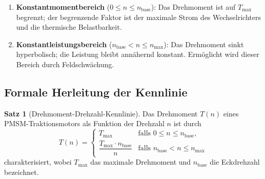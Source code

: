 ﻿\documentclass[a4paper,12pt]{article}
\theoremstyle{definition}
\newtheorem{satz}{Satz}
\begin{document}
\begin{enumerate}
    \item \textbf{Konstantmomentbereich} ($0 \leq n \leq n_{\mathrm{base}}$):
          Das Drehmoment ist auf $T_{\max}$ begrenzt; der begrenzende Faktor ist
          der maximale Strom des Wechselrichters und die thermische Belastbarkeit.
    \item \textbf{Konstantleistungsbereich} ($n_{\mathrm{base}} < n \leq n_{\max}$):
          Das Drehmoment sinkt hyperbolisch; die Leistung bleibt annähernd konstant.
          Ermöglicht wird dieser Bereich durch Feldschwächung.
\end{enumerate}

\subsection{Formale Herleitung der Kennlinie}

\begin{satz}[Drehmoment-Drehzahl-Kennlinie]
\label{satz:kennlinie}
    Das Drehmoment $T(n)$ eines PMSM-Traktionsmotors als Funktion der Drehzahl $n$
    ist durch
    \[
        T(n) =
        \begin{cases}
            T_{\max}                            & \text{falls } 0 \leq n \leq n_{\mathrm{base}}, \\[4pt]
            \dfrac{T_{\max} \cdot n_{\mathrm{base}}}{n} & \text{falls } n_{\mathrm{base}} < n \leq n_{\max}
        \end{cases}
    \]
    charakterisiert, wobei $T_{\max}$ das maximale Drehmoment und $n_{\mathrm{base}}$
    die Eckdrehzahl bezeichnet.
\end{satz}
\end{document}
